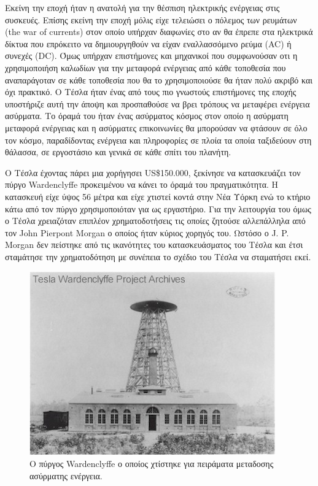 Εκείνη την εποχή ήταν η ανατολή για την θέσπιση ηλεκτρικής ενέργειας στις συσκευές. Επίσης εκείνη την εποχή μόλις είχε τελειώσει ο πόλεμος των ρευμάτων (the war of
currents) στον οποίο υπήρχαν διαφωνίες στο αν θα έπρεπε στα ηλεκτρικά δίκτυα που επρόκειτο να δημιουργηθούν να είχαν εναλλασσόμενο ρεύμα (AC) ή συνεχές (DC). Όμως
υπήρχαν επιστήμονες και μηχανικοί που συμφωνούσαν οτι η χρησιμοποιήση καλωδίων για την μεταφορά ενέργειας από κάθε τοποθεσία που αναπαράγοταν σε κάθε τοποθεσία που
θα το χρησιμοποιούσε θα ήταν πολύ ακριβό και όχι πρακτικό. Ο Τέσλα ήταν ένας από τους πιο γνωστούς επιστήμονες της εποχής υποστήριζε αυτή την άποψη και προσπαθούσε
να βρει τρόπους να μεταφέρει ενέργεια ασύρματα. Το όραμά του ήταν ένας ασύρματος κόσμος στον οποίο η ασύρματη μεταφορά ενέργειας και η ασύρματες επικοινωνίες θα
μπορούσαν να φτάσουν σε όλο τον κόσμο, παραδίδοντας ενέργεια και πληροφορίες σε πλοία τα οποία ταξιδεύουν στη θάλασσα, σε εργοστάσιο και γενικά σε κάθε σπίτι του
πλανήτη.

Ο Τέσλα έχοντας πάρει μια χορήγησει US\$150.000, ξεκίνησε να κατασκευάζει τον πύργο Wardenclyffe προκειμένου να κάνει το όραμά του πραγματικότητα. Η κατασκευή είχε
ύψος 56 μέτρα και είχε χτιστεί κοντά στην Νέα Υόρκη ενώ το κτήριο κάτω από τον πύργο χρησιμοποιόταν για ως εργαστήριο. Για την λειτουργία του όμως ο Tέσλα χρειαζόταν
επιπλέον χρηματοδοτήσεις τις οποίες ζητούσε αλλεπάλληλα από τον John Pierpont Morgan ο οποίος ήταν κύριος χορηγός του. Ωστόσο ο J. P. Morgan δεν πείστηκε από τις
ικανότητες του κατασκευάσματος του Τέσλα και έτσι σταμάτησε την χρηματοδότηση με συνέπεια το σχέδιο του Τέσλα να σταματήσει εκεί.

\begin{figure}[h]
	\centering
	\includegraphics[width=\textwidth]{images/Wardenclyffe_Tower.jpg}
	\caption{Ο πύργος Wardenclyffe ο οποίος χτίστηκε για πειράματα μεταδοσης ασύρματης ενέργεια.}
	\label{fig:Wardenclyffe_Tower}
\end{figure}

